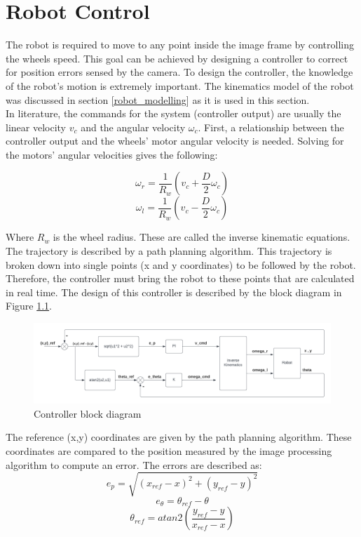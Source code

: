 \chapter{Robot Control}
The robot is required to move to any point inside the image frame by controlling the wheels speed. This goal can be achieved by designing a controller to correct for position errors sensed by the camera. To design the controller, the knowledge of the robot's motion is extremely important. The kinematics model of the robot was discussed in section \ref{robot_modelling} as it is used in this section. \\
In literature, the commands for the system (controller output) are usually the linear velocity $v_c$ and the angular velocity $\omega_c$. First, a relationship between the controller output and the wheels’ motor angular velocity is needed. Solving for the motors’ angular velocities gives the following:

\begin{equation}
    \omega_r = \frac{1}{R_w} (v_c + \frac{D}{2}\omega_c)
\end{equation}
\begin{equation}
    \omega_l = \frac{1}{R_w} (v_c - \frac{D}{2}\omega_c)
\end{equation}

Where $R_w$ is the wheel radius. These are called the inverse kinematic equations.\\
The trajectory is described by a path planning algorithm. This trajectory is broken down into single points (x and y coordinates) to be followed by the robot. Therefore, the controller must bring the robot to these points that are calculated in real time. The design of this controller is described by the block diagram in Figure \ref{block_diagram}.

\begin{figure}[thb]
    \centering
    \includegraphics[width=1\textwidth]{images/Block_diagram.png}
    \caption{Controller block diagram}\label{block_diagram}
\end{figure}

The reference (x,y) coordinates are given by the path planning algorithm. These coordinates are compared to the position measured by the image processing algorithm to compute an error. The errors are described as:
\begin{equation}
    e_p = \sqrt{(x_{ref} - x)^2+(y_{ref} - y)^2}
\end{equation}
\begin{equation}
    e_{\theta} = \theta_{ref} - \theta 
\end{equation}
\begin{equation}
    \theta_{ref} = atan2\left(\frac{y_{ref}-y}{x_{ref} - x}\right)
\end{equation}

